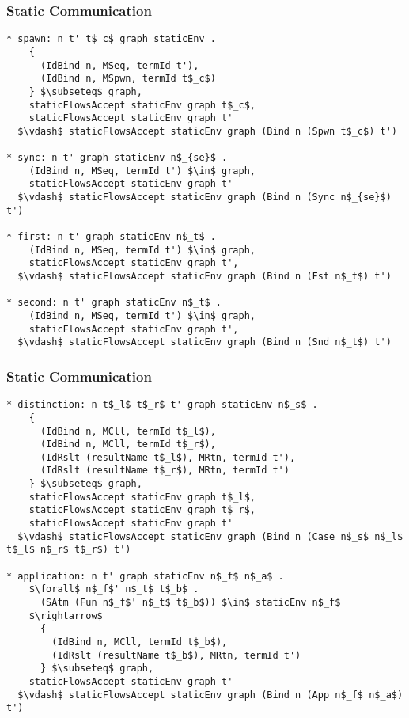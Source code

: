 \documentclass{beamer}
\begin{document}
\begin{frame}[fragile]
	\frametitle{Static Communication}
\begin{lstlisting}[language=logic, mathescape]
* spawn: n t' t$_c$ graph staticEnv .
    {
      (IdBind n, MSeq, termId t'),
      (IdBind n, MSpwn, termId t$_c$)
    } $\subseteq$ graph, 
    staticFlowsAccept staticEnv graph t$_c$, 
    staticFlowsAccept staticEnv graph t'
  $\vdash$ staticFlowsAccept staticEnv graph (Bind n (Spwn t$_c$) t')

* sync: n t' graph staticEnv n$_{se}$ .
    (IdBind n, MSeq, termId t') $\in$ graph, 
    staticFlowsAccept staticEnv graph t'
  $\vdash$ staticFlowsAccept staticEnv graph (Bind n (Sync n$_{se}$) t')

* first: n t' graph staticEnv n$_t$ .
    (IdBind n, MSeq, termId t') $\in$ graph, 
    staticFlowsAccept staticEnv graph t', 
  $\vdash$ staticFlowsAccept staticEnv graph (Bind n (Fst n$_t$) t')

* second: n t' graph staticEnv n$_t$ .
    (IdBind n, MSeq, termId t') $\in$ graph, 
    staticFlowsAccept staticEnv graph t', 
  $\vdash$ staticFlowsAccept staticEnv graph (Bind n (Snd n$_t$) t')
\end{lstlisting}
\end{frame}


\begin{frame}[fragile]
	\frametitle{Static Communication}
\begin{lstlisting}[language=logic, mathescape]
* distinction: n t$_l$ t$_r$ t' graph staticEnv n$_s$ .
    {
      (IdBind n, MCll, termId t$_l$),
      (IdBind n, MCll, termId t$_r$),
      (IdRslt (resultName t$_l$), MRtn, termId t'),
      (IdRslt (resultName t$_r$), MRtn, termId t')
    } $\subseteq$ graph, 
    staticFlowsAccept staticEnv graph t$_l$, 
    staticFlowsAccept staticEnv graph t$_r$,
    staticFlowsAccept staticEnv graph t'
  $\vdash$ staticFlowsAccept staticEnv graph (Bind n (Case n$_s$ n$_l$ t$_l$ n$_r$ t$_r$) t')

* application: n t' graph staticEnv n$_f$ n$_a$ .
    $\forall$ n$_f$' n$_t$ t$_b$ . 
      (SAtm (Fun n$_f$' n$_t$ t$_b$)) $\in$ staticEnv n$_f$ 
    $\rightarrow$
      {
        (IdBind n, MCll, termId t$_b$),
        (IdRslt (resultName t$_b$), MRtn, termId t')
      } $\subseteq$ graph,
    staticFlowsAccept staticEnv graph t'
  $\vdash$ staticFlowsAccept staticEnv graph (Bind n (App n$_f$ n$_a$) t')
\end{lstlisting}
\end{frame}
\end{document}
